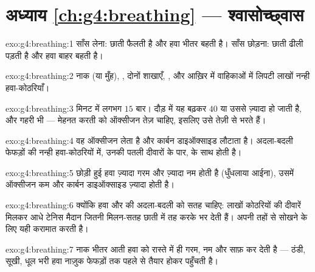 \section*{अध्याय \ref{ch:g4:breathing} --- श्वासोच्छ्वास}

\begin{solution}{exo:g4:breathing:1}
साँस लेना: छाती फैलती है और हवा भीतर बहती है। साँस छोड़ना: छाती ढीली
पड़ती है और हवा बाहर बहती है।
\end{solution}

\begin{solution}{exo:g4:breathing:2}
नाक (या मुँह), , दोनों शाखाएँ, , और आख़िर में 
वाहिकाओं में लिपटी लाखों नन्ही हवा-कोठरियाँ।
\end{solution}

\begin{solution}{exo:g4:breathing:3}
मिनट में लगभग $15$ बार। दौड़ में यह बढ़कर $40$ या उससे ज़्यादा हो जाती
है, और गहरी भी --- मेहनत करती  को ऑक्सीजन तेज़ चाहिए, इसलिए
 उसे तेज़ी से भरते हैं।
\end{solution}

\begin{solution}{exo:g4:breathing:4}
वह ऑक्सीजन लेता है और कार्बन डाइऑक्साइड लौटाता है। अदला-बदली फेफड़ों की
नन्ही हवा-कोठरियों में, उनकी पतली दीवारों के पार,  के साथ होती
है।
\end{solution}

\begin{solution}{exo:g4:breathing:5}
छोड़ी हुई हवा ज़्यादा गरम और ज़्यादा नम होती है (धुँधलाया आईना), उसमें
ऑक्सीजन कम और कार्बन डाइऑक्साइड ज़्यादा होती है।
\end{solution}

\begin{solution}{exo:g4:breathing:6}
क्योंकि हवा और  की अदला-बदली को सतह चाहिए: लाखों कोठरियों की
दीवारें मिलकर आधे टेनिस मैदान जितनी मिलन-सतह छाती में तह करके भर देती
हैं।  अपनी तहों से  सोखने के लिए यही करामात करती है।
\end{solution}

\begin{solution}{exo:g4:breathing:7}
नाक भीतर आती हवा को रास्ते में ही गरम, नम और साफ़ कर देती है --- ठंडी,
सूखी, धूल भरी हवा नाज़ुक फेफड़ों तक पहले से तैयार होकर पहुँचती है।
\end{solution}

